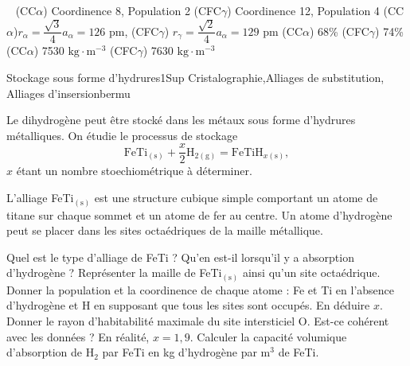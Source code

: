 \begin{solution}
    \begin{questions}
        \question ~
        \question (CC$\alpha$) Coordinence 8, Population 2 (CFC$\gamma$) Coordinence 12, Population 4
        \question (CC$\alpha$)$r_\alpha = \dfrac{\sqrt{3}}{4} a_\alpha = 126$ pm, (CFC$\gamma$)  $r_\gamma = \dfrac{\sqrt{2}}{4} a_\alpha = 129$ pm
        \question  (CC$\alpha$) 68\% (CFC$\gamma$) 74\%
        \question  (CC$\alpha$) 7530 $\mathrm{kg\cdot m^{-3}}$ (CFC$\gamma$) 7630 $\mathrm{kg\cdot m^{-3}}$
    \end{questions}
\end{solution}



\begin{exercise}{Stockage sous forme d'hydrures}{1}{Sup}
{Cristalographie,Alliages de substitution, Alliages d'insersion}{bermu}

Le dihydrogène peut être stocké dans les métaux sous forme d'hydrures métalliques. On étudie le processus de stockage
$$\mathrm{FeTi_{(s)} + \frac{\mathit{x}}{2} H_{2(g)} = FeTiH_{\mathit{x}(s)}},$$
$\mathit{x}$ étant un nombre stoechiométrique à déterminer.

L'alliage FeTi$_\mathrm{(s)}$ est une structure cubique simple comportant un atome de titane sur chaque sommet et un atome de fer au centre. Un atome d'hydrogène peut se placer dans les sites octaédriques de la maille métallique.

\begin{questions}
    \question Quel est le type d'alliage de FeTi ? Qu'en est-il lorsqu'il y a absorption d'hydrogène ?
    \question Représenter la maille de FeTi$_\mathrm{(s)}$ ainsi qu'un site octaédrique.
    \question Donner la population et la coordinence de chaque atome : Fe et Ti en l'absence d'hydrogène et H en supposant que tous les sites sont occupés. En déduire $\mathit{x}$.
    \question Donner le rayon d'habitabilité maximale du site intersticiel O. Est-ce cohérent avec les données ?
    \question En réalité, $\mathit{x} = 1,9$. Calculer la capacité volumique d'absorption de H$_2$ par FeTi en kg d'hydrogène par m$^3$ de FeTi.
\end{questions}


\end{exercise}
